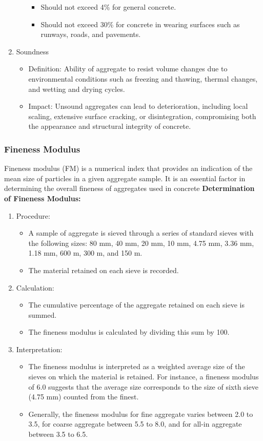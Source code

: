 \documentclass[a4paper,11pt]{book}
\begin{document}
\begin{enumerate}
\begin{itemize}
\begin{itemize}
	\item	Should not exceed 4\% for general concrete.
	\item	Should not exceed 30\% for concrete in wearing surfaces such as runways, roads, and pavements.
 \end{itemize}
\end{itemize}
 \item Soundness
\begin{itemize}
    \item 

		Definition: Ability of aggregate to resist volume changes due to environmental conditions such as freezing and thawing, thermal changes, and wetting and drying cycles.
	\item	Impact: Unsound aggregates can lead to deterioration, including local scaling, extensive surface cracking, or disintegration, compromising both the appearance and structural integrity of concrete.
 \end{itemize}
 \end{enumerate}
 \subsubsection{Fineness Modulus}
 Fineness modulus (FM) is a numerical index that provides an indication of the mean size of particles in a given aggregate sample. It is an essential factor in determining the overall fineness of aggregates used in concrete
 \textbf{Determination of Fineness Modulus:}
 \begin{enumerate} 
 
\item	Procedure:
\begin{itemize}
     

	\item A sample of aggregate is sieved through a series of standard sieves with the following sizes: 80 mm, 40 mm, 20 mm, 10 mm, 4.75 mm, 3.36 mm, 1.18 mm, 600 \textmu m, 300 \textmu m, and 150 \textmu m.
	\item	The material retained on each sieve is recorded.
 \end{itemize}
	\item	Calculation:
 \begin{itemize}
	\item	The cumulative percentage of the aggregate retained on each sieve is summed.
	\item	The fineness modulus is calculated by dividing this sum by 100.
 \end{itemize}
	\item	Interpretation:
 \begin{itemize}
	\item	The fineness modulus is interpreted as a weighted average size of the sieves on which the material is retained. For instance, a fineness modulus of 6.0 suggests that the average size corresponds to the size of sixth sieve (4.75 mm) counted from the finest.
	\item	Generally, the fineness modulus for fine aggregate varies between 2.0 to 3.5, for coarse aggregate between 5.5 to 8.0, and for all-in aggregate between 3.5 to 6.5.
 \end{itemize}
 \end{enumerate}
\end{document}
